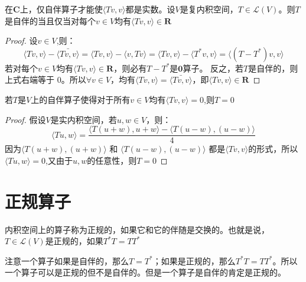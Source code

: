 \documentclass[10pt,a4paper,UTF8]{article}
\begin{document}
\begin{tikztheorem}
在\(\mathbf{C}\)上，仅自伴算子才能使\(\langle Tv,v \rangle\)都是实数。设\(V\)是复内积空间，\(T\in \mathcal{L}(V)\)。则\(T\)是自伴的当且仅当对每个\(v\in V\)均有\(\langle Tv,v \rangle \in \mathbf{R}\)
\end{tikztheorem}
\begin{proof}
设\(v\in V\),则：
\begin{equation}
\label{eq:13}
\langle Tv,v \rangle - \bar{ \langle Tv,v \rangle  } = \langle Tv,v \rangle - \langle v,Tv \rangle = \langle Tv,v \rangle - \langle T^{*}v,v \rangle = \langle (T- T^{*})v,v \rangle
\end{equation}
若对每个\(v\in V\)均有\(\langle Tv,v \rangle \in \mathbf{R}\)，则必有\(T-T^{*}\)是\(\mathbf{0}\)算子。
反之，若\(T\)是自伴的，则上式右端等于 0。所以\(\forall v\in V\)，均有\(\langle Tv,v \rangle = \bar{\langle Tv,v \rangle}\)，即\(\langle Tv,v \rangle\in \mathbf{R}\)
\end{proof}
\begin{tikztheorem}
若\(T\)是\(V\)上的自伴算子使得对于所有\(v\in V\)均有\(\langle Tv,v \rangle  = 0\),则\(T=0\)
\end{tikztheorem}
\begin{proof}
假设\(V\)是实内积空间，若\(u,w\in V\)，则：
\begin{equation}
\label{eq:14}
\langle Tu,w \rangle  = \frac{ \langle T(u+w),u+w \rangle  - \langle T(u-w),(u-w) \rangle  }{4}
\end{equation}
因为\(\langle T(u+w),(u+w) \rangle\) 和 \(\langle T(u-w),(u-w) \rangle\) 都是\(\langle Tv,v \rangle\)的形式，所以\(\langle Tu,w \rangle =0\),又由于\(u,w\)的任意性，则\(T=0\)
\end{proof}
\section{正规算子}
\label{sec:org13b436a}


\begin{definition}
内积空间上的算子称为正规的，如果它和它的伴随是交换的。也就是说，\(T\in \mathcal{L}(V)\)是正规的，如果\(T^{*}T=TT^{*}\)
\end{definition}
注意一个算子如果是自伴的，那么\(T=T^{*}\)；如果是正规的，那么\(T^{*}T = TT^{*}\)。所以一个算子可以是正规的但不是自伴的。但是一个算子是自伴的肯定是正规的。
\end{document}
